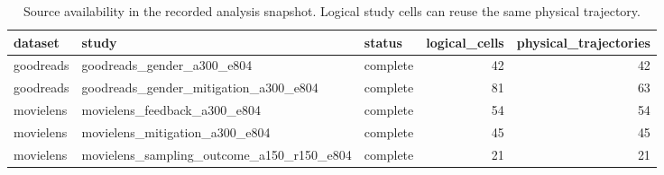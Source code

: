 \begin{table}[htbp!]
\centering
\small
\setlength{\tabcolsep}{3pt}
\renewcommand{\arraystretch}{1.1}
\begin{tabular}{lllrr}
\hline
dataset & study & status & logical\_cells & physical\_trajectories \\
\hline
goodreads & goodreads\_gender\_a300\_e804 & complete & 42 & 42 \\
goodreads & goodreads\_gender\_mitigation\_a300\_e804 & complete & 81 & 63 \\
movielens & movielens\_feedback\_a300\_e804 & complete & 54 & 54 \\
movielens & movielens\_mitigation\_a300\_e804 & complete & 45 & 45 \\
movielens & movielens\_sampling\_outcome\_a150\_r150\_e804 & complete & 21 & 21 \\
\hline
\end{tabular}
\caption{Source availability in the recorded analysis snapshot. Logical study cells can reuse the same physical trajectory.}
\label{chap:results:tab:analysis_source_status}
\end{table}

